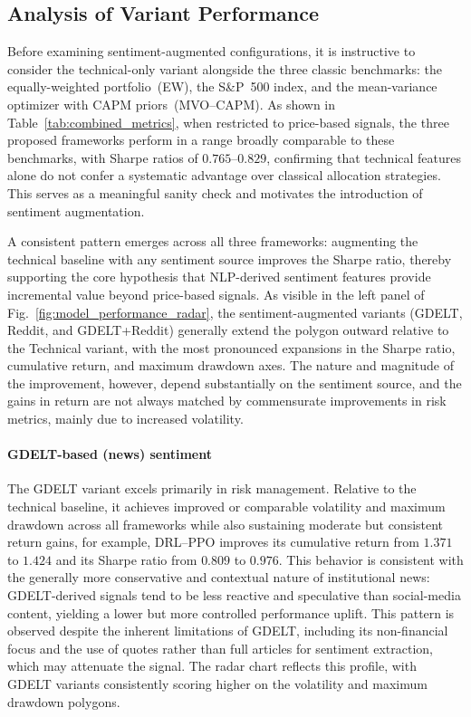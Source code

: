 \subsection{Analysis of Variant Performance}
\label{sec:intra_variant}

Before examining sentiment-augmented configurations, it is instructive to consider the technical-only variant alongside the three classic benchmarks: the equally-weighted portfolio~(EW), the S\&P~500 index, and the mean-variance optimizer with CAPM priors~(MVO--CAPM). As shown in Table~\ref{tab:combined_metrics}, when restricted to price-based signals, the three proposed frameworks perform in a range broadly comparable to these benchmarks, with Sharpe ratios of $0.765$--$0.829$, confirming that technical features alone do not confer a systematic advantage over classical allocation strategies. This serves as a meaningful sanity check and motivates the introduction of sentiment augmentation.

A consistent pattern emerges across all three frameworks: augmenting the technical baseline with any sentiment source improves the Sharpe ratio, thereby supporting the core hypothesis that NLP-derived sentiment features provide incremental value beyond price-based signals. As visible in the left panel of Fig.~\ref{fig:model_performance_radar}, the sentiment-augmented variants (GDELT, Reddit, and GDELT+Reddit) generally extend the polygon outward relative to the Technical variant, with the most pronounced expansions in the Sharpe ratio, cumulative return, and maximum drawdown axes. The nature and magnitude of the improvement, however, depend substantially on the sentiment source, and the gains in return are not always matched by commensurate improvements in risk metrics, mainly due to increased volatility.

\paragraph{GDELT-based (news) sentiment} The GDELT variant excels primarily in risk management. Relative to the technical baseline, it achieves improved or comparable volatility and maximum drawdown across all frameworks while also sustaining moderate but consistent return gains, for example, DRL--PPO improves its cumulative return from $1.371$ to $1.424$ and its Sharpe ratio from $0.809$ to $0.976$. This behavior is consistent with the generally more conservative and contextual nature of institutional news: GDELT-derived signals tend to be less reactive and speculative than social-media content, yielding a lower but more controlled performance uplift. This pattern is observed despite the inherent limitations of GDELT, including its non-financial focus and the use of quotes rather than full articles for sentiment extraction, which may attenuate the signal. The radar chart reflects this profile, with GDELT variants consistently scoring higher on the volatility and maximum drawdown polygons.

